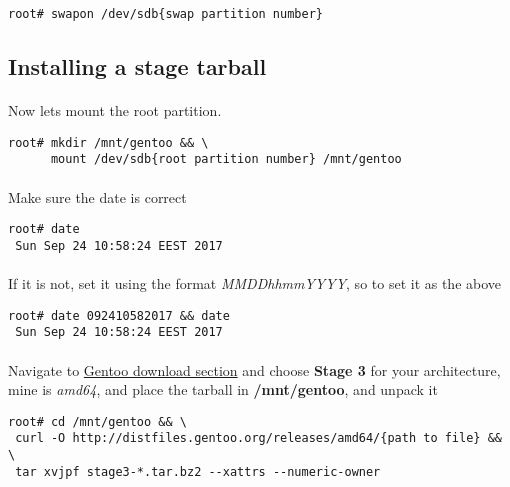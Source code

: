 \documentclass[11pt,a4paper]{article}
\begin{document}
                \begin{lstlisting}[style=BashInputRoot]
root# swapon /dev/sdb{swap partition number}
                \end{lstlisting}

        \newpage
        \subsection{Installing a stage tarball}
            \paragraph{} Now lets mount the root partition.

            \begin{lstlisting}[style=BashInputRoot]
root# mkdir /mnt/gentoo && \
      mount /dev/sdb{root partition number} /mnt/gentoo
            \end{lstlisting}

            \paragraph{} Make sure the date is correct

            \begin{lstlisting}[style=BashInputRoot]
root# date
 Sun Sep 24 10:58:24 EEST 2017
            \end{lstlisting}

            \paragraph{} If it is not, set it using the format \textit{MMDDhhmmYYYY}, so to set it as the above

            \begin{lstlisting}[style=BashInputRoot]
root# date 092410582017 && date
 Sun Sep 24 10:58:24 EEST 2017
            \end{lstlisting}

            \paragraph{} Navigate to \href{https://www.gentoo.org/downloads/}{Gentoo download section} and choose \textbf{Stage 3} for your architecture, mine is \textit{amd64}, and place the tarball in \textbf{/mnt/gentoo}, and unpack it

            \begin{lstlisting}[style=BashInputRoot]
root# cd /mnt/gentoo && \
 curl -O http://distfiles.gentoo.org/releases/amd64/{path to file} && \
 tar xvjpf stage3-*.tar.bz2 --xattrs --numeric-owner
            \end{lstlisting}
\end{document}
